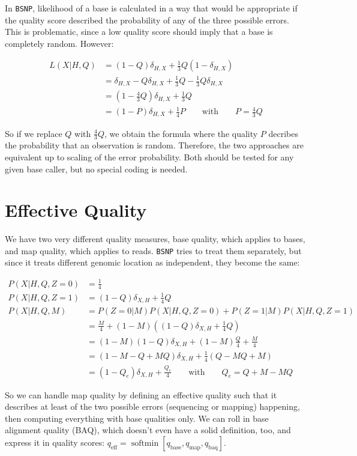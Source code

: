 \documentclass{article}
\begin{document}
In \texttt{BSNP}, likelihood of a base is calculated in a way that would be appropriate if the quality score described the
probability of any of the three possible errors.  This is problematic, since a low quality score should imply that a base is
completely random.  However:

\begin{align*}
L(X|H,Q) &= (1-Q)\delta_{H,X} + \frac{1}{3} Q (1-\delta_{H,X}) \\
&= \delta_{H,X} - Q\delta_{H,X} + \frac{1}{3}Q - \frac{1}{3}Q\delta_{H,X} \\
&= (1-\frac{4}{3}Q)\delta_{H,X} + \frac{1}{3}Q \\
&= (1-P) \delta_{H,X} + \frac{1}{4}P \qquad \mbox{with} \qquad P=\frac{4}{3}Q
\end{align*}

So if we replace $Q$ with $\frac{4}{3}Q$, we obtain the formula where the quality $P$ decribes the probability that an observation
is random.  Therefore, the two approaches are equivalent up to scaling of the error probability.  Both should be tested for any
given base caller, but no special coding is needed.

\section{Effective Quality}
\label{app_qualities}

We have two very different quality measures, base quality, which applies to bases, and map quality, which applies to reads.
\texttt{BSNP} tries to treat them separately, but since it treats different genomic location as independent, they become the same:

\begin{align*}
P(X|H,Q,Z=0) &= \frac{1}{4} \\
P(X|H,Q,Z=1) &= (1-Q)\delta_{X,H} + \frac{1}{4}Q \\
P(X|H,Q,M) &= P(Z=0|M) P(X|H,Q,Z=0) + P(Z=1|M) P(X|H,Q,Z=1) \\
&= \frac{M}{4} + (1-M)\left((1-Q)\delta_{X,H} + \frac{1}{4}Q \right) \\
&= (1-M)(1-Q)\delta_{X,H} + (1-M)\frac{Q}{4} + \frac{M}{4} \\
&= (1-M-Q+MQ) \delta_{X,H} + \frac{1}{4}(Q-MQ+M) \\
&= (1-Q_e) \delta_{X,H} + \frac{Q_e}{4} \qquad \mbox{with} \qquad Q_e = Q+M-MQ
\end{align*}

So we can handle map quality by defining an effective quality such that it describes at least of the two possible errors (sequencing
or mapping) happening, then computing everything with base qualities only.  We can roll in base alignment quality (BAQ), which
doesn't even have a solid definition, too, and express it in quality scores: $q_{\operatorname{eff}} = \operatorname{softmin} \left[
q_{\operatorname{base}}, q_{\operatorname{map}}, q_{\operatorname{baq}} \right]$. 
\end{document}
